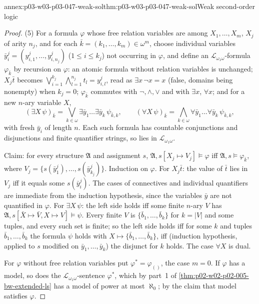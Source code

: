 \begin{annexitem}{annex:p03-w03-p03-047-weak-sol}{thm:p03-w03-p03-047-weak-sol}{Weak second-order logic}
\begin{proof}
(5) For a formula \(\varphi\) whose free relation variables are among
\(X_1,\ldots,X_m\), \(X_j\) of arity \(n_j\), and for each
\(\bar k=(k_1,\ldots,k_m)\in\omega^m\), choose individual variables
\(\bar y^j_i=(y^j_{i,1},\ldots,y^j_{i,n_j})\) (\(1\le i\le k_j\)) not
occurring in \(\varphi\), and define an \(\mathscr L_{\omega_1\omega}\)-formula
\(\varphi_{\bar k}\) by recursion on \(\varphi\): an atomic formula without
relation variables is unchanged; \(X_j\bar t\) becomes
\(\bigvee_{i=1}^{k_j}\bigwedge_{l=1}^{n_j}t_l=y^j_{i,l}\), read as
\(\exists x\,\neg x=x\) (false, domains being nonempty) when \(k_j=0\);
\(\varphi_{\bar k}\) commutes with \(\neg,\land,\lor\) and with \(\exists x\),
\(\forall x\); and for a new \(n\)-ary variable \(X\),
\[
 (\exists X\,\psi)_{\bar k}=\bigvee_{k\in\omega}\exists\bar y_1\ldots\exists\bar y_k\,\psi_{\bar k,k},
 \qquad
 (\forall X\,\psi)_{\bar k}=\bigwedge_{k\in\omega}\forall\bar y_1\ldots\forall\bar y_k\,\psi_{\bar k,k},
\]
with fresh \(\bar y_i\) of length \(n\).  Each such formula has countable
conjunctions and disjunctions and finite quantifier strings, so lies in
\(\mathscr L_{\omega_1\omega}\).

Claim: for every structure \(\mathfrak A\) and assignment \(s\),
\(\mathfrak A,s[X_j\mapsto V_j]\models\varphi\) iff
\(\mathfrak A,s\models\varphi_{\bar k}\), where
\(V_j=\{s(\bar y^j_1),\ldots,s(\bar y^j_{k_j})\}\).  Induction on \(\varphi\).
For \(X_j\bar t\): the value of \(\bar t\) lies in \(V_j\) iff it equals some
\(s(\bar y^j_i)\).  The cases of connectives and individual quantifiers are
immediate from the induction hypothesis, since the variables \(\bar y\) are
not quantified in \(\varphi\).  For \(\exists X\,\psi\): the left side holds
iff some finite \(n\)-ary \(V\) has \(\mathfrak A,s[\bar X\mapsto\bar V,X\mapsto V]\models\psi\).
Every finite \(V\) is \(\{\bar b_1,\ldots,\bar b_k\}\) for \(k=|V|\) and some
tuples, and every such set is finite; so the left side holds iff for some
\(k\) and tuples \(\bar b_1,\ldots,\bar b_k\) the formula \(\psi\) holds with
\(X\mapsto\{\bar b_1,\ldots,\bar b_k\}\), iff (induction hypothesis, applied
to \(s\) modified on \(\bar y_1,\ldots,\bar y_k\)) the disjunct for \(k\)
holds.  The case \(\forall X\) is dual.

For \(\varphi\) without free relation variables put
\(\varphi^\ast=\varphi_{()}\), the case \(m=0\).  If \(\varphi\) has a model,
so does the \(\mathscr L_{\omega_1\omega}\)-sentence \(\varphi^\ast\), which
by part~1 of \cref{thm:p02-w02-p02-005-bw-extended-ls} has a model of power
at most \(\aleph_0\); by the claim that model satisfies \(\varphi\).
\end{proof}
\end{annexitem}

